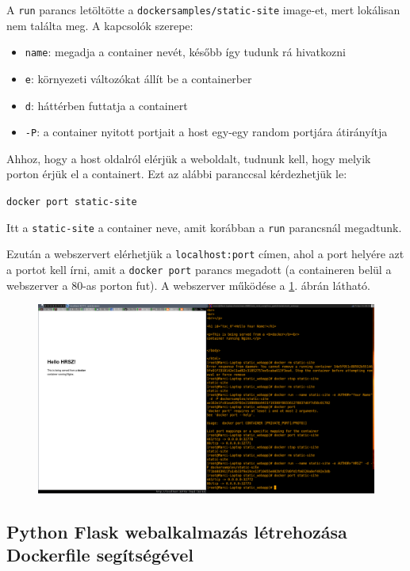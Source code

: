 \documentclass[]{article}
\numberwithin{equation}{section}
\begin{document}
A \texttt{run} parancs letöltötte a \texttt{dockersamples/static-site} image-et, mert lokálisan nem találta meg. A kapcsolók szerepe:

\begin{itemize}
	\item \texttt{name}: megadja a container nevét, később így tudunk rá hivatkozni
	\item \texttt{e}: környezeti változókat állít be a containerber
	\item \texttt{d}: háttérben futtatja a containert
	\item \texttt{-P}: a container nyitott portjait a host egy-egy random portjára átirányítja
\end{itemize}

Ahhoz, hogy a host oldalról elérjük a weboldalt, tudnunk kell, hogy melyik porton érjük el a containert. Ezt az alábbi paranccsal kérdezhetjük le:

\texttt{docker port static-site}

Itt a \texttt{static-site} a container neve, amit korábban a \texttt{run} parancsnál megadtunk.

Ezután a webszervert elérhetjük a \texttt{localhost:port} címen, ahol a port helyére azt a portot kell írni, amit a \texttt{docker port} parancs megadott (a containeren belül a webszerver a 80-as porton fut). A webszerver működése a \ref{fig:webapp1}. ábrán látható.

\begin{figure}[H]
	\centering
	\includegraphics[width=0.9\linewidth]{webapp1}
	\caption{}
	\label{fig:webapp1}
\end{figure}

\subsection{Python Flask webalkalmazás létrehozása Dockerfile segítségével}
\end{document}
